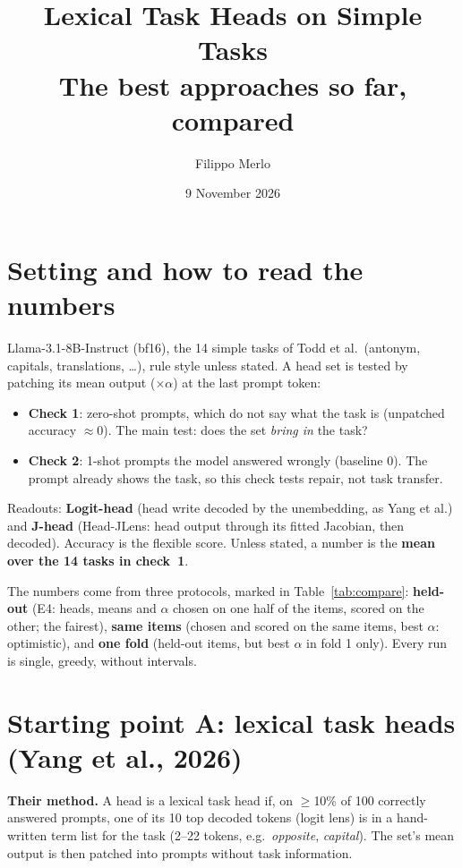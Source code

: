 \documentclass[10pt,a4paper]{article}
\title{Lexical Task Heads on Simple Tasks\\\large The best approaches so far, compared}
\author{Filippo Merlo}
\date{9 November 2026}
\begin{document}
\maketitle
\vspace{-1.5em}

\section*{Setting and how to read the numbers}

Llama-3.1-8B-Instruct (bf16), the 14 simple tasks of Todd et al.\ (antonym, capitals, translations, \dots), rule style unless stated. A head set is tested by patching its mean output ($\times\alpha$) at the last prompt token:
\begin{itemize}
\item \textbf{Check 1}: zero-shot prompts, which do not say what the task is (unpatched accuracy $\approx 0$). The main test: does the set \emph{bring in} the task?
\item \textbf{Check 2}: 1-shot prompts the model answered wrongly (baseline 0). The prompt already shows the task, so this check tests repair, not task transfer.
\end{itemize}
Readouts: \textbf{Logit-head} (head write decoded by the unembedding, as Yang et al.) and \textbf{J-head} (Head-JLens: head output through its fitted Jacobian, then decoded). Accuracy is the flexible score. Unless stated, a number is the \textbf{mean over the 14 tasks in check~1}.

The numbers come from three protocols, marked in Table~\ref{tab:compare}: \textbf{held-out} (E4: heads, means and $\alpha$ chosen on one half of the items, scored on the other; the fairest), \textbf{same items} (chosen and scored on the same items, best $\alpha$: optimistic), and \textbf{one fold} (held-out items, but best $\alpha$ in fold 1 only). Every run is single, greedy, without intervals.

\section{Starting point A: lexical task heads (Yang et al., 2026)}

\textbf{Their method.} A head is a lexical task head if, on $\geq$10\% of 100 correctly answered prompts, one of its 10 top decoded tokens (logit lens) is in a hand-written term list for the task (2--22 tokens, e.g.\ \emph{opposite}, \emph{capital}). The set's mean output is then patched into prompts without task information.
\end{document}
